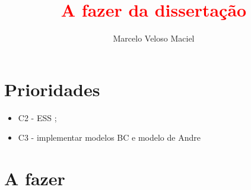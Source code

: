 \documentclass{article}
\title{\textcolor{red}{A fazer da dissertação}}
\author{Marcelo Veloso Maciel}
\date{}
\begin{document}
\pagecolor{base03}
\color{base1}



\maketitle

\section*{Prioridades}

\begin{itemize}
  
\item {\Large C2 - ESS  };  
\item {\Large C3 - implementar modelos BC e modelo de Andre }
  
\end{itemize}

\section*{A fazer}
\end{document}
